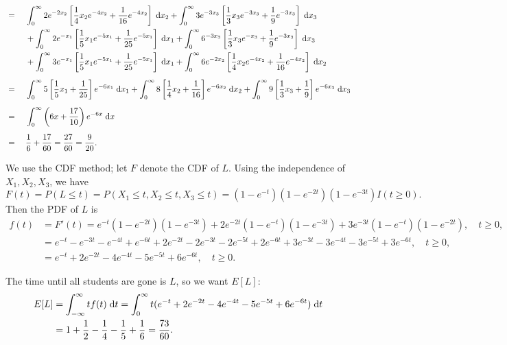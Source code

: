 \documentclass{homework}
\begin{document}
\begin{alphaparts}
\begin{alignat*}{2}
		&={}&& \int_0^\infty  2e^{-2x_2} \left[\frac{1}{4}x_2e^{-4x_2} + \frac{1}{16} e^{-4x_2}\right] \;\text{d} x_2 + \int_0^\infty 3e^{-3x_3} \left[\frac{1}{3}x_3e^{-3x_3} + \frac{1}{9}e^{-3x_3}\right]\;\text{d} x_3 \\
		&&&{}+ \int_0^\infty 2e^{-x_1}\left[\frac{1}{5}x_1e^{-5x_1} + \frac{1}{25}e^{-5x_1}\right] \;\text{d} x_1 + \int_0^\infty 6^{-3x_3}\left[\frac{1}{3}x_3e^{-x_3} + \frac{1}{9}e^{-3x_3}\right] \;\text{d} x_3 \\
		&&&{}+ \int_0^\infty 3e^{-x_1}\left[\frac{1}{5}x_1e^{-5x_1} + \frac{1}{25}e^{-5x_1}\right] \;\text{d} x_1 + \int_0^\infty 6e^{-2x_2} \left[\frac{1}{4}x_2e^{-4x_2} + \frac{1}{16}e^{-4x_2}\right] \;\text{d} x_2 \\[0.5em]
		&={}&& \int_0^\infty 5\left[\frac{1}{5}x_1 + \frac{1}{25}\right]e^{-6x_1}\;\text{d} x_1 + \int_0^\infty  8\left[\frac{1}{4}x_2 + \frac{1}{16}\right]e^{-6x_2} \;\text{d} x_2 + \int_0^\infty 9 \left[\frac{1}{3}x_3 + \frac{1}{9}\right] e^{-6x_3}\;\text{d} x_3 \\[0.5em]
			&={}&& \int_0^\infty \left(6x + \frac{17}{10}\right)e^{-6x}\;\text{d} x \\[0.5em]
			&={}&& \frac{1}{6} + \frac{17}{60} = \frac{27}{60} = \frac{9}{20}.
		\end{alignat*}
	
	\questionpart We use the CDF method; let $F$ denote the CDF of $L$. Using the independence of $X_1, X_2, X_3$, we have
	\begin{equation*}
		F(t) = P(L \le t) = P(X_1 \le t, X_2 \le t, X_3 \le t) = (1-e^{-t})(1-e^{-2t})(1-e^{-3t})I(t \ge 0).
	\end{equation*}
	Then the PDF of $L$ is
	\begin{align*}
		f(t) &= F'(t) = e^{-t}(1-e^{-2t})(1-e^{-3t}) +2e^{-2t}(1-e^{-t})(1-e^{-3t}) + 3e^{-3t}(1-e^{-t})(1-e^{-2t}), \quad t \ge 0, \\
		&= e^{-t} - e^{-3t} - e^{-4t} + e^{-6t} + 2e^{-2t} - 2e^{-3t} -2e^{-5t} + 2e^{-6t} + 3e^{-3t} - 3e^{-4t} -3e^{-5t} + 3e^{-6t}, \quad t \ge 0,\\
		&=  e^{-t} + 2e^{-2t} - 4e^{-4t} -5 e^{-5t} + 6e^{-6t}, \quad t \ge 0.
	\end{align*}
	
	\questionpart The time until all students are gone is $L$, so we want $E[L]$:
	\begin{align*}
		E[L] &= \int_{-\infty}^\infty tf(t)\;\text{d} t = \int_0^\infty t(e^{-t} + 2e^{-2t} - 4e^{-4t} -5 e^{-5t} + 6e^{-6t})\;\text{d} t \\
		&= 1 + \frac{1}{2} - \frac{1}{4} - \frac{1}{5} + \frac{1}{6} = \frac{73}{60}.
	\end{align*}
	\end{alphaparts}
	
\end{document}
